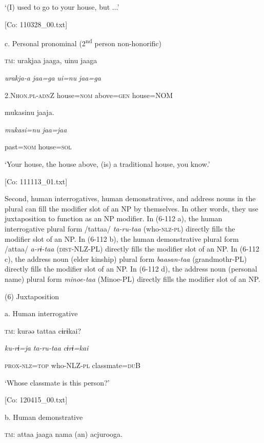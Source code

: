       ‘(I) used to go to your house, but ...’

      [Co: 110328\_00.txt]

  c.  Personal pronominal (2\textsuperscript{nd} person non-honorific)

    \textsc{tm}:  urakjaa  jaaga,  uinu  jaaga

      \textit{urakja-a}  \textit{jaa=ga}  \textit{ui=nu}  \textit{jaa=ga}

      2.N\textsc{hon}.\textsc{pl}-\textsc{adn}Z  house=\textsc{nom}  above=\textsc{gen}  house=NOM

      mukasinu  jaaja.

      \textit{mukasi=nu}  \textit{jaa=jaa}

      past=\textsc{nom}  house=\textsc{sol}

      ‘Your house, the house above, (is) a traditional house, you know.’

      [Co: 111113\_01.txt]

  Second, human interrogatives, human demonstratives, and address nouns in the plural can fill the modifier slot of an NP by themselves. In other words, they use juxtaposition to function as an NP modifier. In (6-112 a), the human interrogative plural form /tattaa/ \textit{ta-ru-taa} (who-\textsc{nlz}-\textsc{pl}) directly fills the modifier slot of an NP. In (6-112 b), the human demonstrative plural form /attaa/ \textit{a-rɨ-taa} (\textsc{dist}-NLZ-PL) directly fills the modifier slot of an NP. In (6-112 c), the address noun (elder kinship) plural form \textit{baasan-taa} (grandmothr-PL) directly fills the modifier slot of an NP. In (6-112 d), the address noun (personal name) plural form \textit{minoe-taa} (Minoe-PL) directly fills the modifier slot of an NP.

(6)  Juxtaposition

  a.  Human interrogative

    \textsc{tm}:  kurəə  tattaa  cɨrɨkai?

      \textit{ku-rɨ=ja}  \textit{ta-ru-taa}  \textit{cɨrɨ=kai}

      \textsc{prox}-\textsc{nlz}=\textsc{top}  who-NLZ-\textsc{pl}  classmate=\textsc{du}B

      ‘Whose classmate is this person?’

      [Co: 120415\_00.txt]

  b.  Human demonstrative

    \textsc{tm}:  attaa  jaaga  nama  (an)  acjurooga.

